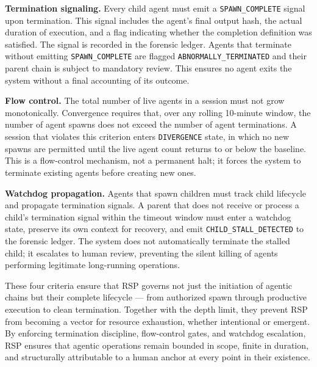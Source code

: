 \textbf{Termination signaling.} Every child agent must emit a \texttt{SPAWN\_COMPLETE} signal upon termination. This signal includes the agent's final output hash, the actual duration of execution, and a flag indicating whether the completion definition was satisfied. The signal is recorded in the forensic ledger. Agents that terminate without emitting \texttt{SPAWN\_COMPLETE} are flagged \texttt{ABNORMALLY\_TERMINATED} and their parent chain is subject to mandatory review. This ensures no agent exits the system without a final accounting of its outcome.

\textbf{Flow control.} The total number of live agents in a session must not grow monotonically. Convergence requires that, over any rolling 10-minute window, the number of agent spawns does not exceed the number of agent terminations. A session that violates this criterion enters \texttt{DIVERGENCE} state, in which no new spawns are permitted until the live agent count returns to or below the baseline. This is a flow-control mechanism, not a permanent halt; it forces the system to terminate existing agents before creating new ones.

\textbf{Watchdog propagation.} Agents that spawn children must track child lifecycle and propagate termination signals. A parent that does not receive or process a child's termination signal within the timeout window must enter a watchdog state, preserve its own context for recovery, and emit \texttt{CHILD\_STALL\_DETECTED} to the forensic ledger. The system does not automatically terminate the stalled child; it escalates to human review, preventing the silent killing of agents performing legitimate long-running operations.

These four criteria ensure that RSP governs not just the initiation of agentic chains but their complete lifecycle — from authorized spawn through productive execution to clean termination. Together with the depth limit, they prevent RSP from becoming a vector for resource exhaustion, whether intentional or emergent. By enforcing termination discipline, flow-control gates, and watchdog escalation, RSP ensures that agentic operations remain bounded in scope, finite in duration, and structurally attributable to a human anchor at every point in their existence.